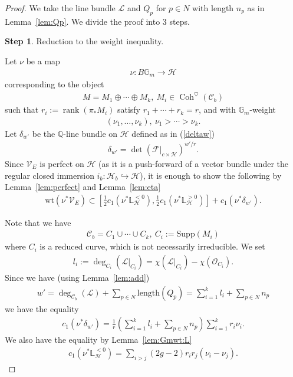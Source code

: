 \documentclass[11pt,oneside,a4paper,mathscr]{amsart}
\theoremstyle{definition}
\newtheorem{step}{Step}
\newcommand{\cH}{\mathcal{H}}
\newcommand{\cC}{\mathcal{C}}
\newcommand{\cF}{\mathcal{F}}
\newcommand{\bgm}{B\mathbb{G}_m}
\newcommand{\Coh}{\operatorname{Coh}}
\begin{document}
\begin{proof}
We take the line bundle $\mathcal{L}$ and $Q_p$ for $p\in N$ with length $n_p$ as in Lemma~\ref{lem:Qp}.
We divide the proof into 3 steps. 
\begin{step}
    Reduction to the weight inequality.
\end{step}
Let $\nu$ be a map 
\begin{align*}
    \nu \colon \bgm \to \cH
\end{align*}
corresponding to the object 
\begin{align*}
M=M_1 \oplus \cdots \oplus M_k, \ M_i \in \Coh^{\heartsuit}(\cC_b)
\end{align*}
such that $r_i:=\operatorname{rank}(\pi_{*}M_i)$
satisfy $r_1+\cdots+r_k=r$, and 
with $\mathbb{G}_m$-weight
\begin{align*}(\nu_1, \ldots, \nu_k), \ 
\nu_1>\cdots>\nu_k.
\end{align*}
Let $\delta_{w'}$ be the $\mathbb{Q}$-line bundle on $\cH$ defined as in (\ref{deltaw})
\begin{align*}
    \delta_{w'}=\det (\cF|_{c\times \cH})^{w'/r}.
\end{align*}
Since $\mathcal{V}_E$ is perfect on $\cH$ (as it is a push-forward of a vector bundle under the regular closed immersion $i_b \colon \cH_b \hookrightarrow \cH$),
it is enough to show the following by Lemma~\ref{lem:perfect} and Lemma~\ref{lem:eta}
\begin{align}\label{wt:V1}
    \mathrm{wt}(\nu^* \mathcal{V}_E) \subset \left[\frac{1}{2}c_1(\nu^* \mathbb{L}_{\cH}^{<0}), 
    \frac{1}{2}c_1(\nu^* \mathbb{L}_{\cH}^{>0})\right]+c_1(\nu^* \delta_{w'}).
\end{align}

Note that we have 
\begin{align*}
    \cC_b=C_1 \cup \cdots \cup C_k, \ C_i:=\mathrm{Supp}(M_i)
\end{align*}
where $C_i$ is a reduced curve, which is not necessarily irreducible. 
We set 
\begin{align*}
    l_i:=\deg_{C_i}(\mathcal{L}|_{C_i})=\chi(\mathcal{L}|_{C_i})-\chi(\mathcal{O}_{C_i}).
\end{align*}
Since we have (using Lemma~\ref{lem:add})
\begin{align*}
    w'=\deg_{\cC_b}(\mathcal{L})+\sum_{p\in N}\mathrm{length}(Q_p)
    =\sum_{i=1}^k l_i+\sum_{p\in N}n_p
\end{align*}
we have the equality 
\begin{align*}
    c_1(\nu^* \delta_{w'})=\frac{1}{r}\left(\sum_{i=1}^k l_i+\sum_{p\in N}n_p  \right)
  \sum_{i=1}^k r_i \nu_i.
\end{align*}
We also have the equality by Lemma~\ref{lem:Gmwt:L}
\begin{align*}
    c_1(\nu^* \mathbb{L}_{\cH}^{<0})=\sum_{i>j} (2g-2)r_i r_j(\nu_i-\nu_j).
\end{align*}


\end{proof}
\end{document}
